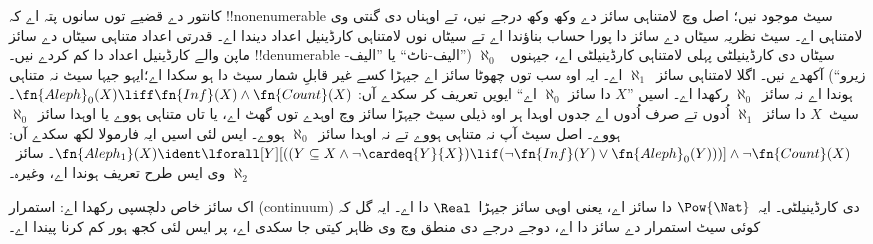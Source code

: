 \documentclass[../../../include/open-logic-section]{subfiles}
\begin{document}
کانتور دے قضیے توں سانوں پتہ اے کہ !!{nonenumerable} سیٹ موجود نیں؛
اصل وچ لامتناہی سائز دے وکھ وکھ درجے نیں، تے اوہناں دی گنتی وی لامتناہی اے۔
سیٹ نظریہ سیٹاں دے سائز دا پورا حساب بناؤندا اے تے سیٹاں نوں
لامتناہی کارڈینیل اعداد دیندا اے۔ قدرتی اعداد متناہی سیٹاں دے سائز ماپن والے
کارڈینیل اعداد دا کم کردے نیں۔ !!{denumerable}
سیٹاں دی کارڈینیلٹی پہلی لامتناہی کارڈینیلٹی اے، جیہنوں
~$\aleph_0$ (”الیف-ناٹ“ یا ”الیف-زیرو“) آکھدے نیں۔ اگلا
لامتناہی سائز~$\aleph_1$ اے۔ ایہ اوہ سب توں چھوٹا سائز اے جیہڑا
کسے غیر قابلِ شمار سیٹ دا ہو سکدا اے؛ایہو جیہا سیٹ نہ متناہی ہوندا
اے نہ سائز~$\aleph_0$ رکھدا اے۔ اسیں ”$X$ دا سائز $\aleph_0$
اے“ ایویں تعریف کر سکدے آں:
$\fn{Aleph}_0(X) \liff \fn{Inf}(X) \land \fn{Count}(X)$۔
سیٹ~$X$ دا سائز~$\aleph_1$ اُدوں تے صرف اُدوں اے جدوں
اوہدا ہر اوہ ذیلی سیٹ جیہڑا سائز وچ اوہدے توں گھٹ اے، یا تاں
متناہی ہووے یا اوہدا سائز~$\aleph_0$ ہووے۔ اصل سیٹ آپ نہ
متناہی ہووے تے نہ اوہدا سائز~$\aleph_0$ ہووے۔
ایس لئی اسیں ایہ فارمولا لکھ سکدے آں:
$\fn{Aleph_1}(X) \ident \lforall[Y][((Y \subseteq X \land
  \lnot\cardeq{Y}{X}) \lif
  (\lnot\fn{Inf}(Y) \lor \fn{Aleph}_0(Y)))] \land \lnot
\fn{Count}(X)$۔ سائز~$\aleph_2$ وی ایس طرح تعریف ہوندا اے، وغیرہ۔

اک سائز خاص دلچسپی رکھدا اے: استمرار (continuum) دی کارڈینیلٹی۔
ایہ~$\Pow{\Nat}$ دا سائز اے، یعنی اوہی سائز جیہڑا~$\Real$ دا اے۔
ایہ گل کہ کوئی سیٹ استمرار دے سائز دا اے، دوجے درجے دی منطق وچ
وی ظاہر کیتی جا سکدی اے، پر ایس لئی کجھ ہور کم کرنا پیندا اے۔
\end{document}
